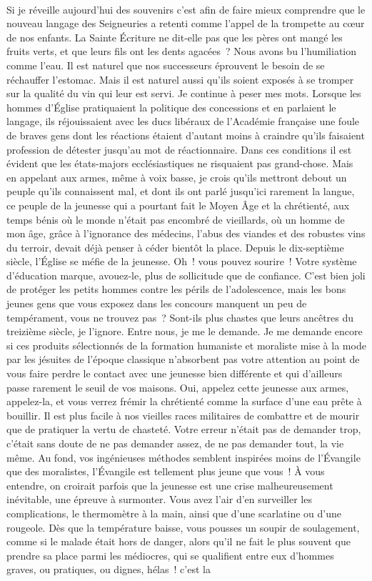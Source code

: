 \documentclass[french,twoside]{book} %
\begin{document}
\noindent  \par
Si je réveille aujourd’hui des souvenirs c’est afin de faire mieux comprendre que le nouveau langage des Seigneuries a retenti comme l’appel de la trompette au cœur de nos enfants. La Sainte Écriture ne dit-elle pas que les pères ont mangé les fruits verts, et que leurs fils ont les dents agacées ? Nous avons bu l’humiliation comme l’eau. Il est naturel que nos successeurs éprouvent le besoin de se réchauffer l’estomac. Mais il est naturel aussi qu’ils soient exposés à se tromper sur la qualité du vin qui leur est servi. Je continue à peser mes mots. Lorsque les hommes d’Église pratiquaient la politique des concessions et en parlaient le langage, ils réjouissaient avec les ducs libéraux de l’Académie française une foule de braves gens dont les réactions étaient d’autant moins à craindre qu’ils faisaient profession de détester jusqu’au mot de réactionnaire. Dans ces conditions il est évident que les états-majors ecclésiastiques ne risquaient pas grand-chose. Mais en appelant aux armes, même à voix basse, je crois qu’ils mettront debout un peuple qu’ils connaissent mal, et dont ils ont parlé jusqu’ici rarement la langue, ce peuple de la jeunesse qui a pourtant fait le Moyen Âge et la chrétienté, aux temps bénis où le monde n’était pas encombré de vieillards, où un homme de mon âge, grâce à l’ignorance des médecins, l’abus des viandes et des robustes vins du terroir, devait déjà penser à céder bientôt la place. Depuis le dix-septième siècle, l’Église se méfie de la jeunesse. Oh ! vous pouvez sourire ! Votre système d’éducation marque, avouez-le, plus de sollicitude que de confiance. C’est bien joli de protéger les petits hommes contre les périls de l’adolescence, mais les bons jeunes gens que vous exposez dans les concours manquent un peu de tempérament, vous ne trouvez pas ? Sont-ils plus chastes que leurs ancêtres du treizième siècle, je l’ignore. Entre nous, je me le demande. Je me demande encore si ces produits sélectionnés de la formation humaniste et moraliste mise à la mode par les jésuites de l’époque classique n’absorbent pas votre attention au point de vous faire perdre le contact avec une jeunesse bien différente et qui d’ailleurs passe rarement le seuil de vos maisons. Oui, appelez cette jeunesse aux armes, appelez-la, et vous verrez frémir la chrétienté comme la surface d’une eau prête à bouillir. Il est plus facile à nos vieilles races militaires de combattre et de mourir que de pratiquer la vertu de chasteté. Votre erreur n’était pas de demander trop, c’était sans doute de ne pas demander assez, de ne pas demander tout, la vie même. Au fond, vos ingénieuses méthodes semblent inspirées moins de l’Évangile que des moralistes, l’Évangile est tellement plus jeune que vous ! À vous entendre, on croirait parfois que la jeunesse est une crise malheureusement inévitable, une épreuve à surmonter. Vous avez l’air d’en surveiller les complications, le thermomètre à la main, ainsi que d’une scarlatine ou d’une rougeole. Dès que la température baisse, vous pousses un soupir de soulagement, comme si le malade était hors de danger, alors qu’il ne fait le plus souvent que prendre sa place parmi les médiocres, qui se qualifient entre eux d’hommes graves, ou pratiques, ou dignes, hélas ! c’est la 
\end{document}
